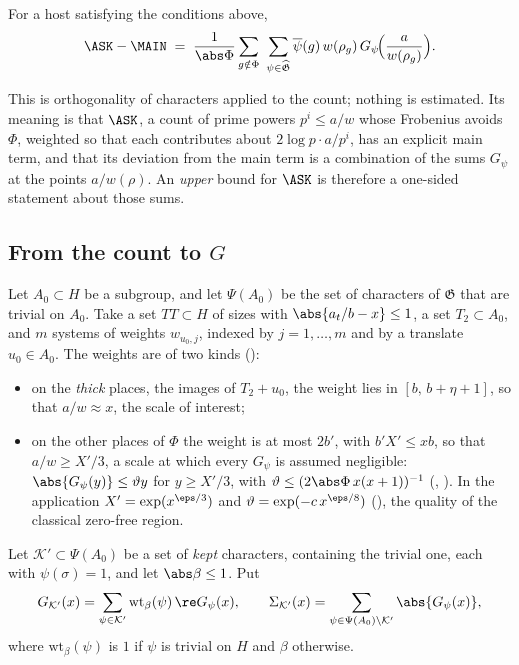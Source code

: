 \begin{statement}\label{st:balance}
For a host satisfying the conditions above,
\[
\ASK-\MAIN\;=\;\frac1{\abs\Phi}\sum_{g\notin\Phi}\ \sum_{\psi\in\widehat{\mathfrak G}}
\overline{\psi}(g)\,w(\rho_g)\,G_\psi\!\Bigl(\frac{a}{w(\rho_g)}\Bigr).
\]
\end{statement}
This is orthogonality of characters applied to the count; nothing is estimated. Its meaning is
that $\ASK$, a count of prime powers $p^i\le a/w$ whose Frobenius avoids $\Phi$, weighted so
that each contributes about $2\log p\cdot a/p^i$, has an explicit main term, and that its deviation from the
main term is a combination of the sums $G_\psi$ at the points $a/w(\rho)$. An \emph{upper}
bound for $\ASK$ is therefore a one-sided statement about those sums.

\subsection{From the count to $G$}\label{sec:reduction}
Let $A_0\subset H$ be a subgroup, and let $\Psi(A_0)$ be the set of characters of
$\mathfrak G$ that are trivial on $A_0$. Take a set $TT\subset H$ of sizes with
$\abs{a_t/b-x}\le1$, a set $T_2\subset A_0$, and $m$ systems of weights
$w_{u_0,j}$, indexed by $j=1,\dots,m$ and by a translate $u_0\in A_0$. The weights are of two
kinds \lvS{} ():
\begin{itemize}
\item on the \emph{thick} places, the images of $T_2+u_0$, the weight lies in $[b,\,b+\eta+1]$,
  so that $a/w\approx x$, the scale of interest;
\item on the other places of $\Phi$ the weight is at most $2b'$, with $b'X'\le xb$, so that
  $a/w\ge X'/3$, a scale at which every $G_\psi$ is assumed negligible:
  $\abs{G_\psi(y)}\le\vartheta y$ for $y\ge X'/3$, with $\vartheta\le(2\abs\Phi\,x(x+1))^{-1}$
  (, ). In the application $X'=\exp(x^{\eps/3})$ and
  $\vartheta=\exp(-c\,x^{\eps/8})$ \lvS{} (), the quality of the classical
  zero-free region.
\end{itemize}
Let $\mathcal K'\subset\Psi(A_0)$ be a set of \emph{kept} characters, containing the trivial one,
each with $\psi(\sigma)=1$, and let $\abs\beta\le1$. Put
\[
G_{\mathcal K'}(x)=\sum_{\psi\in\mathcal K'}\mathrm{wt}_\beta(\psi)\,\re G_\psi(x),\qquad
\Sigma_{\mathcal K'}(x)=\sum_{\psi\in\Psi(A_0)\setminus\mathcal K'}\abs{G_\psi(x)},
\]
where $\mathrm{wt}_\beta(\psi)$ is $1$ if $\psi$ is trivial on $H$ and $\beta$ otherwise.

